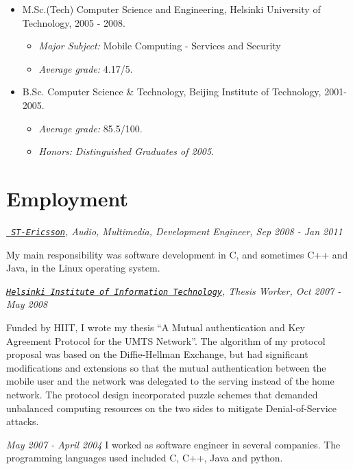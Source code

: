 \documentclass[10pt,letterpaper]{article}
\newenvironment{aperiod}{
  \begin{list}{}{
    \setlength{\leftmargin}{1.5em}
    \setlength{\itemsep}{1em}
    \setlength{\parskip}{0pt}
    \setlength{\parsep}{0.25em}
  }
}{
  \end{list}
}
\begin{document}
\begin{itemize}
\item M.Sc.(Tech) Computer Science and Engineering, Helsinki
  University of Technology, 2005 - 2008.
  \begin{itemize}
  \item {\it Major Subject:} Mobile Computing - Services and Security
  \item {\it Average grade:} 4.17/5.
  \end{itemize}

\item B.Sc. Computer Science \& Technology, Beijing Institute of
  Technology, 2001- 2005.
  \begin{itemize}
  \item {\it Average grade:} 85.5/100.
  \item {\it Honors:} \textit{Distinguished Graduates of 2005}.
  \end{itemize}
\end{itemize}

\section*{Employment}
\begin{aperiod}
\item {\it \href{http://www.stericsson.com}{\tt
      ST-Ericsson}, Audio, Multimedia, Development Engineer, Sep 2008
    - Jan 2011}

  My main responsibility was software development in C, and sometimes
  C++ and Java, in the Linux operating system.

\item {\it \href{http://www.hiit.fi}{\tt Helsinki
      Institute of Information Technology}, Thesis Worker, Oct 2007 -
    May 2008}

  Funded by HIIT, I wrote my thesis ``A Mutual authentication and Key
  Agreement Protocol for the UMTS Network''. The algorithm of my
  protocol proposal was based on the Diffie-Hellman Exchange, but had
  significant modifications and extensions so that the mutual
  authentication between the mobile user and the network was delegated
  to the serving instead of the home network. The protocol design
  incorporated puzzle schemes that demanded unbalanced computing
  resources on the two sides to mitigate Denial-of-Service attacks.

\item {\it May 2007 - April 2004}
  I worked as software engineer in several companies. The programming
  languages used included C, C++, Java and python.
\end{aperiod}
\end{document}
